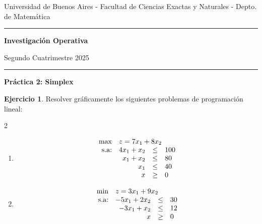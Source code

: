 \documentclass[12pt]{article}
\theoremstyle{definition}
\newtheorem{ejer}{Ejercicio}
\newcommand{\bej}{\begin{ejer}}
\newcommand{\fej}{\end{ejer}}
\begin{document}

\centerline{{\small Universidad de Buenos Aires - Facultad de Ciencias Exactas y Naturales - Depto. de Matemática}}

\vskip 0.2cm

\hrule

\vskip 0.2cm

 \centerline{{\bf\Large{\sc Investigación Operativa}}}

 \vskip 0.2cm

 \centerline{\ttfamily Segundo Cuatrimestre 2025}

\vskip 0.2cm

 \hrule

 \bigskip
 \centerline{\bf Práctica 2: Simplex}
 \bigskip

\bej
Resolver gráficamente los siguientes problemas de programación lineal:
\begin{multicols}{2}
\begin{enumerate}[label=\alph*)]
    \item \[
            \begin{array}{rrcl}
            \max & \multicolumn{3}{l}{z = 7x_1+8x_2} \\
            \text{s.a:} & 4x_1+x_2 & \leq & 100 \\
             & x_1+x_2 & \leq & 80 \\
             & x_1 & \leq & 40 \\
             & x& \geq & 0
            \end{array}
            \]
    \item \[
            \begin{array}{rrcl}
            \min & \multicolumn{2}{l}{z = 3x_1+9x_2} \\
            \text{s.a:} & -5x_1+2x_2 & \leq & 30 \\
             & -3x_1+x_2 & \leq & 12 \\
              & x& \geq & 0
            \end{array}
            \]
\end{enumerate}
\end{multicols}
\fej
\end{document}

